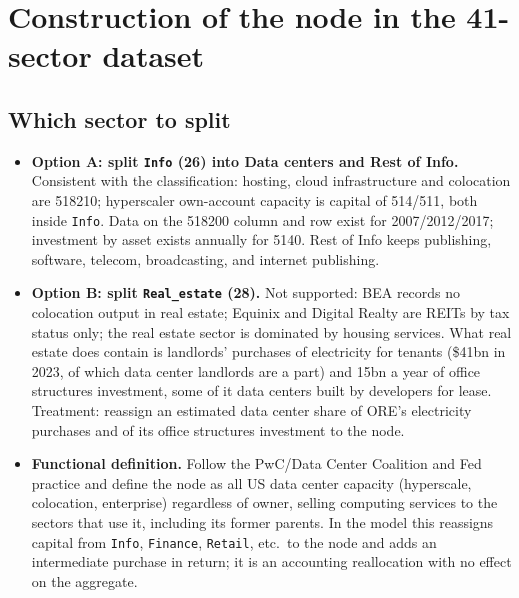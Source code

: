 \documentclass[11pt]{article}
\begin{document}
\section{Construction of the node in the 41-sector dataset}\label{sec:design}

\subsection{Which sector to split}
\begin{itemize}
  \item \textbf{Option A: split \texttt{Info} (26) into Data centers and Rest of Info.} Consistent with the classification: hosting, cloud infrastructure and colocation are 518210; hyperscaler own-account capacity is capital of 514/511, both inside \texttt{Info}. Data on the 518200 column and row exist for 2007/2012/2017; investment by asset exists annually for 5140. Rest of Info keeps publishing, software, telecom, broadcasting, and internet publishing.
  \item \textbf{Option B: split \texttt{Real\_estate} (28).} Not supported: BEA records no colocation output in real estate; Equinix and Digital Realty are REITs by tax status only; the real estate sector is dominated by housing services. What real estate does contain is landlords' purchases of electricity for tenants (\$41bn in 2023, of which data center landlords are a part) and 15bn a year of office structures investment, some of it data centers built by developers for lease. Treatment: reassign an estimated data center share of ORE's electricity purchases and of its office structures investment to the node.
  \item \textbf{Functional definition.} Follow the PwC/Data Center Coalition and Fed practice and define the node as all US data center capacity (hyperscale, colocation, enterprise) regardless of owner, selling computing services to the sectors that use it, including its former parents. In the model this reassigns capital from \texttt{Info}, \texttt{Finance}, \texttt{Retail}, etc.\ to the node and adds an intermediate purchase in return; it is an accounting reallocation with no effect on the aggregate.
\end{itemize}
\end{document}
